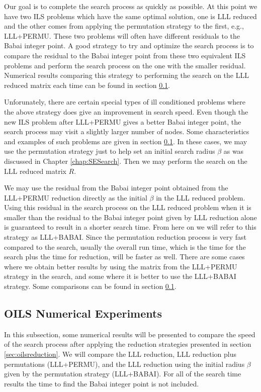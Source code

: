 \documentclass[12pt,Bold,letterpaper]{mcgilletdclass}
\newcommand{\vsp}{\vspace{\baselineskip}}
\begin{document}
Our goal is to complete the search process as quickly as possible. At this point we have two ILS problems which have the same optimal solution, one is LLL reduced and the other comes from applying the permutation strategy to the first, e.g., LLL+PERMU. These two problems will often have different residuals to the Babai integer point. A good strategy to try and optimize the search process is to compare the residual to the Babai integer point from these two equivalent ILS problems and perform the search process on the one with the smaller residual. Numerical results comparing this strategy to performing the search on the LLL reduced matrix each time can be found in section \ref{sec:ILSReductionResults}.

Unforunately, there are certain special types of ill conditioned problems where the above strategy does give an improvement in search speed. Even though the new ILS problem after LLL+PERMU gives a better Babai integer point, the search process may visit a slightly larger number of nodes. Some characteristics and examples of such problems are given in section \ref{sec:ILSReductionResults}. In these cases, we may use the permutation strategy just to help set an initial search radius $\beta$ as was discussed in Chapter \ref{chap:SESearch}. Then we may perform the search on the LLL reduced matrix $R$.

We may use the residual from the Babai integer point obtained from the LLL+PERMU reduction directly as the initial $\beta$ in the LLL reduced problem. Using this residual in the search process on the LLL reduced problem when it is smaller than the residual to the Babai integer point given by LLL reduction alone is guaranteed to result in a shorter search time. From here on we will refer to this strategy as LLL+BABAI. Since the permutation reduction process is very fast compared to the search, usually the overall run time, which is the time for the search plus the time for reduction, will be faster as well. There are some cases where we obtain better results by using the matrix from the LLL+PERMU strategy in the search, and some where it is better to use the LLL+BABAI strategy. Some comparisons can be found in section \ref{sec:ILSReductionResults}.

\vsp \subsection{OILS Numerical Experiments} \label{sec:ILSReductionResults}
In this subsection, some numerical results will be presented to compare the speed of the search process after applying the reduction strategies presented in section \ref{sec:oilsreduction}. We will compare the LLL reduction, LLL reduction plus permutations (LLL+PERMU), and the LLL reduction using the initial radius $\beta$ given by the permutation strategy (LLL+BABAI). For all of the search time results the time to find the Babai integer point is not included.
\end{document}
